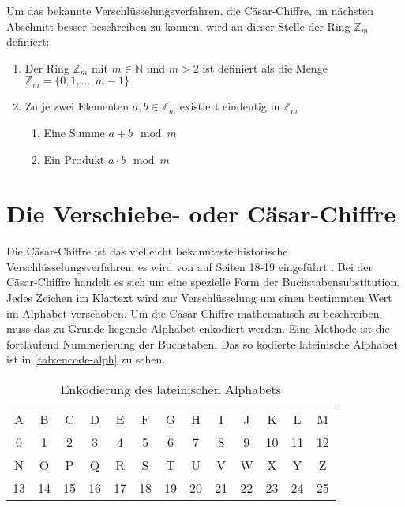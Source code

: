 \newpage
\noindent
Um das bekannte Verschlüsselungsverfahren, die Cäsar-Chiffre, im nächsten Abschnitt
besser beschreiben zu können, wird an dieser Stelle der Ring $\mathbb{Z}_m$ definiert:
\begin{definition}[Der Ring $\mathbb{Z}_m$ der Reste modulo $m$]
  \leavevmode
  \begin{enumerate}[itemsep = 0pt]
    \item Der Ring $\mathbb{Z}_m$ mit $m \in \mathbb{N}$ und $m > 2$ ist
          definiert als die Menge $\mathbb{Z}_m = \{0,1,\dots,m - 1\}$
    \item Zu je zwei Elementen $a,b \in \mathbb{Z}_m$ existiert eindeutig in $\mathbb{Z}_m$
          \begin{enumerate}[itemsep = 0pt, topsep=0pt]
            \item Eine Summe $a + b \mod{m}$
            \item Ein Produkt $a \cdot b \mod{m}$
          \end{enumerate}
  \end{enumerate}
\end{definition}

\section{Die Verschiebe- oder Cäsar-Chiffre}
Die Cäsar-Chiffre ist das vielleicht bekannteste historische Verschlüsselungsverfahren,
es wird von \citeauthor{BOOK:crypto} auf Seiten 18-19 eingeführt \parencite*{BOOK:crypto}.
Bei der Cäsar-Chiffre handelt es sich um eine spezielle Form der Buchstabensubstitution.
Jedes Zeichen im Klartext wird zur Verschlüsselung um einen bestimmten Wert
im Alphabet verschoben.
Um die Cäsar-Chiffre mathematisch zu
beschreiben, muss das zu Grunde liegende Alphabet enkodiert werden.
Eine Methode ist die fortlaufend Nummerierung der Buchstaben. Das so kodierte
lateinische Alphabet ist in \autoref{tab:encode-alph} zu sehen.

\begin{table}[h]
  \centering
  \caption{Enkodierung des lateinischen Alphabets}
  \begin{tabular}{|c|c|c|c|c|c|c|c|c|c|c|c|c|}
    \hline
    A  & B  & C  & D  & E  & F  & G  & H  & I  & J  & K  & L  & M  \\
    0  & 1  & 2  & 3  & 4  & 5  & 6  & 7  & 8  & 9  & 10 & 11 & 12 \\
    \hline
    N  & O  & P  & Q  & R  & S  & T  & U  & V  & W  & X  & Y  & Z  \\
    13 & 14 & 15 & 16 & 17 & 18 & 19 & 20 & 21 & 22 & 23 & 24 & 25 \\
    \hline
  \end{tabular}
  \label{tab:encode-alph}
\end{table}


